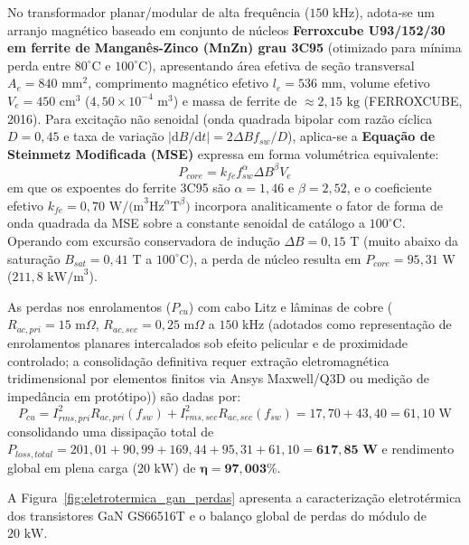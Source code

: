 No transformador planar/modular de alta frequência ($150\text{ kHz}$), adota-se um arranjo magnético baseado em conjunto de núcleos \textbf{Ferroxcube U93/152/30 em ferrite de Manganês-Zinco (MnZn) grau 3C95} (otimizado para mínima perda entre $80^\circ\text{C}$ e $100^\circ\text{C}$), apresentando área efetiva de seção transversal $A_e = 840\text{ mm}^2$, comprimento magnético efetivo $l_e = 536\text{ mm}$, volume efetivo $V_e = 450\text{ cm}^3$ ($4{,}50 \times 10^{-4}\text{ m}^3$) e massa de ferrite de $\approx 2{,}15\text{ kg}$ (FERROXCUBE, 2016). Para excitação não senoidal (onda quadrada bipolar com razão cíclica $D = 0{,}45$ e taxa de variação $|\mathrm{d}B/\mathrm{d}t| = 2 \Delta B f_{sw} / D$), aplica-se a \textbf{Equação de Steinmetz Modificada (MSE)} expressa em forma volumétrica equivalente:
\begin{equation}
    P_{core} = k_{fe} f_{sw}^\alpha \Delta B^\beta V_e
    \label{eq:steinmetz_core}
\end{equation}
em que os expoentes do ferrite 3C95 são $\alpha = 1{,}46$ e $\beta = 2{,}52$, e o coeficiente efetivo $k_{fe} = 0{,}70\text{ W/(m}^3\text{Hz}^\alpha\text{T}^\beta)$ incorpora analiticamente o fator de forma de onda quadrada da MSE sobre a constante senoidal de catálogo a $100^\circ\text{C}$. Operando com excursão conservadora de indução $\Delta B = 0{,}15\text{ T}$ (muito abaixo da saturação $B_{sat} = 0{,}41\text{ T}$ a $100^\circ\text{C}$), a perda de núcleo resulta em $P_{core} = 95{,}31\text{ W}$ ($211{,}8\text{ kW/m}^3$).

As perdas nos enrolamentos ($P_{cu}$) com cabo Litz e lâminas de cobre ($R_{ac,pri} = 15\text{ m}\Omega$, $R_{ac,sec} = 0{,}25\text{ m}\Omega$ a $150\text{ kHz}$ (adotados como representação de enrolamentos planares intercalados sob efeito pelicular e de proximidade controlado; a consolidação definitiva requer extração eletromagnética tridimensional por elementos finitos via Ansys Maxwell/Q3D ou medição de impedância em protótipo)) são dadas por:
\begin{equation}
    P_{cu} = I_{rms,pri}^2 R_{ac,pri}(f_{sw}) + I_{rms,sec}^2 R_{ac,sec}(f_{sw}) = 17{,}70 + 43{,}40 = 61{,}10\text{ W}
    \label{eq:perdas_cobre}
\end{equation}
consolidando uma dissipação total de $P_{loss,total} = 201{,}01 + 90{,}99 + 169{,}44 + 95{,}31 + 61{,}10 = \mathbf{617{,}85\text{ W}}$ e rendimento global em plena carga ($20\text{ kW}$) de $\boldsymbol{\eta = 97{,}003\%}$.

A Figura~\ref{fig:eletrotermica_gan_perdas} apresenta a caracterização eletrotérmica dos transistores GaN GS66516T e o balanço global de perdas do módulo de $20\text{ kW}$.

